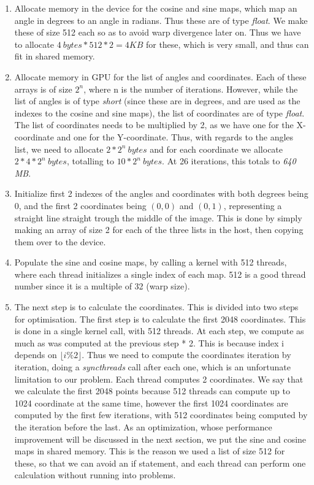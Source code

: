 \begin{enumerate}
	\item Allocate memory in the device for the cosine and sine maps, which map an angle in degrees to an angle in radians. Thus these are of type \textit{float}. We make these of size 512 each so as to avoid warp divergence later on. Thus we have to allocate $4\ bytes * 512 * 2 = 4KB$ for these, which is very small, and thus can fit in shared memory.
	
	\item Allocate memory in GPU for the list of angles and coordinates. Each of these arrays is of size $2^n$, where n is the number of iterations. However, while the list of angles is of type \textit{short} (since these are in degrees, and are used as the indexes to the cosine and sine maps), the list of coordinates are of type \textit{float}. The list of coordinates needs to be multiplied by 2, as we have one for the X-coordinate and one for the Y-coordinate. Thus, with regards to the angles list, we need to allocate $2*2^n\ bytes$ and for each coordinate we allocate $2*4*2^n\ bytes$, totalling to $10*2^n\ bytes$. At 26 iterations, this totals to \textit{640 MB}.
	
	\item Initialize first 2 indexes of the angles and coordinates with both degrees being 0, and the first 2 coordinates being $(0,0)$ and $(0,1)$, representing a straight line straight trough the middle of the image. This is done by simply making an array of size 2 for each of the three lists in the host, then copying them over to the device.
	
	\item Populate the sine and cosine maps, by calling a kernel with 512 threads, where each thread initializes a single index of each map. 512 is a good thread number since it is a multiple of 32 (warp size).
	
	\item The next step is to calculate the coordinates. This is divided into two steps for optimisation. The first step is to calculate the first 2048 coordinates. This is done in a single kernel call, with 512 threads. At each step, we compute as much as was computed at the previous step * 2. This is because index i depends on $\lfloor i\%2 \rfloor$. Thus we need to compute the coordinates iteration by iteration, doing a \textit{syncthreads} call after each one, which is an unfortunate limitation to our problem. Each thread computes 2 coordinates. We say that we calculate the first 2048 points because 512 threads can compute up to 1024 coordinate at the same time, however the first 1024 coordinates are computed by the first few iterations, with 512 coordinates being computed by the iteration before the last. As an optimization, whose performance improvement will be discussed in the next section, we put the sine and cosine maps in shared memory. This is the reason we used a list of size 512 for these, so that we can avoid an if statement, and each thread can perform one calculation without running into problems.
	

\end{enumerate}
